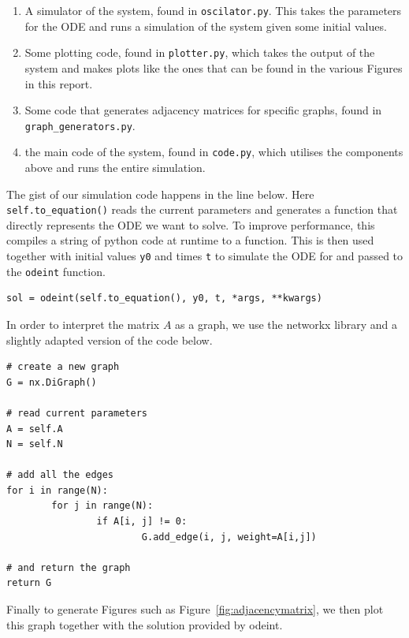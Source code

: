\begin{enumerate}
	\item A simulator of the system, found in \lstinline{oscilator.py}. This takes the parameters for the ODE and runs a simulation of the system given some initial values. 
	\item Some plotting code, found in \lstinline{plotter.py}, which takes the output of the system and makes plots like the ones that can be found in the various Figures in this report. 
	\item Some code that generates adjacency matrices for specific graphs, found in \lstinline{graph_generators.py}. 
	\item the main code of the system, found in \lstinline{code.py}, which utilises the components above and runs the entire simulation. 
\end{enumerate}

The gist of our simulation code happens in the line below. Here \lstinline{self.to_equation()} reads the current parameters and generates a function that directly represents the ODE we want to solve. To improve performance, this compiles a string of python code at runtime to a function. This is then used together with initial values \lstinline{y0} and times \lstinline{t} to simulate the ODE for and passed to the \lstinline{odeint} function. 

\begin{lstlisting}
sol = odeint(self.to_equation(), y0, t, *args, **kwargs)
\end{lstlisting} 

In order to interpret the matrix $A$ as a graph, we use the networkx library and a slightly adapted version of the code below. 

\begin{lstlisting}
# create a new graph
G = nx.DiGraph()

# read current parameters
A = self.A
N = self.N

# add all the edges
for i in range(N):
		for j in range(N):
				if A[i, j] != 0:
						G.add_edge(i, j, weight=A[i,j])

# and return the graph
return G
\end{lstlisting}

Finally to generate Figures such as Figure~\ref{fig:adjacencymatrix}, we then plot this graph together with the solution provided by odeint.  